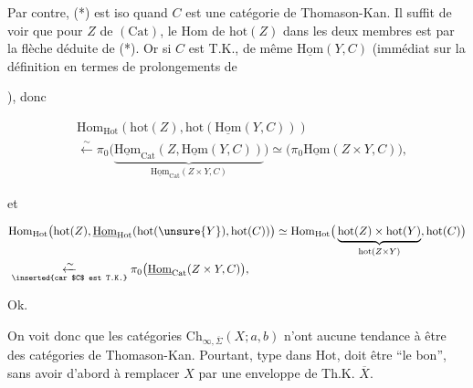 
Par contre, (*) est iso quand $C$ est une catégorie de Thomason-Kan. Il suffit de voir que pour  $Z$ de $(\mathrm{Cat})$, le $\mathrm{Hom}$ de $\mathrm{hot}(Z)$ dans les deux membres est  par la flèche déduite de (*). Or si $C$ est T.K., de même $\underline{\mathrm{Hom}}(Y,C)$ (immédiat sur la définition  en termes de prolongements de 


), donc


\[
\begin{aligned}
&\mathrm{Hom}_{\mathrm{Hot}}(\mathrm{hot}(Z),\mathrm{hot}(\underline{\mathrm{Hom}}(Y,C)))\\
&\xleftarrow{\sim}\pi_0\big(\underbrace{\underline{\mathrm{Hom}}_{\mathrm{Cat}}(Z,\underline{\mathrm{Hom}}(Y,C))}_{\underline{\mathrm{Hom}}_{\mathrm{Cat}}(Z\times Y,C)}\big)
\simeq\big(\pi_0\underline{\mathrm{Hom}}(Z\times Y,C)\big),
\end{aligned}
\]

et 

\[
\begin{aligned}
&\mathrm{Hom}_{\mathrm{Hot}}\big(\mathrm{hot}(Z),\underline{\mathrm{Hom}}_{\mathrm{Hot}}(\mathrm{hot}(\unsure{Y}),\mathrm{hot}(C))\big)
\simeq\mathrm{Hom}_{\mathrm{Hot}}\big(\underbrace{\mathrm{hot}(Z)\times\mathrm{hot}(Y)}_{\mathrm{hot}(Z\times Y)},\mathrm{hot}(C)\big)\\
&\underset{\text{\inserted{car $C$ est T.K.}}}{\xleftarrow{\sim}}\pi_0\big(\underline{\mathrm{Hom}}_{\mathrm{Cat}}(Z\times Y,C)\big),
\end{aligned}
\]

Ok.

On voit donc que les catégories $\mathrm{Ch}_{\infty,\overline\Sigma}(X;a,b)$ n'ont aucune tendance à être des catégories de Thomason-Kan. Pourtant,  type dans $\mathrm{Hot}$, doit être ``le bon'', sans avoir d'abord à remplacer $X$ par une enveloppe de Th.K. $\overline X$.

